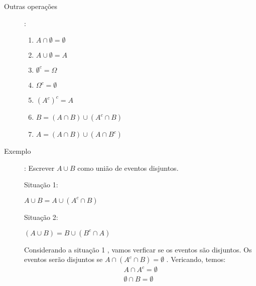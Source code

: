 \documentclass[11pt,a4paper]{book}
\begin{document}
\begin{description}
\begin{description}
  \item [Outras operações]: 

    \begin{enumerate}[leftmargin=*, label=\Roman*., widest=IV, align=left]
      \item     $A \cap \emptyset= \emptyset$ 
      \item     $A \cup \emptyset = A$ 
      \item     $\emptyset^{c} = \Omega$ 
      \item     $ \Omega^c = \emptyset$ 
      \item     $(A^c)^c = A$ 
      \item     $B= (A \cap B)\cup (A^c \cap B)$
      \item     $A= (A \cap B) \cup (A \cap B^c)$
    \end{enumerate}
      \item [Exemplo]: Escrever $A \cup B$ como união de eventos disjuntos.

        \begin{figure}[H]
          \centering
          
          \caption{}
          \label{fig:11}
        \end{figure}

        Situação 1:
        \begin{figure}[H]
          \centering
          
          \caption{}
          \label{fig:12}
        \end{figure}

        $A \cup B = A \cup (A^c \cap B)$

        Situação 2: 

        \begin{figure}[H]
          \centering
          
          \label{fig:13}
        \end{figure}

        $(A \cup B) = B \cup (B^c \cap A)$

        Considerando a situação 1 , vamos verficar se os eventos são disjuntos. Os eventos serão disjuntos se $A \cap ( A^c \cap B )= \emptyset$ . Vericando, temos: 
        \begin{align*}
          A \cap A^c = \emptyset \\
          \emptyset \cap B= \emptyset
        \end{align*}

\end{description}
\end{description}
\end{document}
